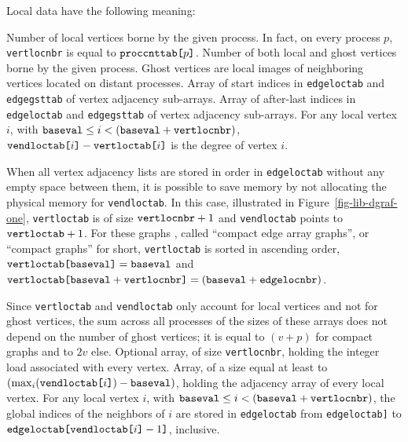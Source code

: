 Local data have the following meaning:
\begin{itemize}
\iteme[{\tt vertlocnbr}]
Number of local vertices borne by the given process. In
fact, on every process $p$, {\tt vert\lbt loc\lbt nbr} is equal to
${\tt proc\lbt cnt\lbt tab}\mbox{\tt [}p\mbox{\tt]}$.
\iteme[{\tt vertgstnbr}]
Number of both local and ghost vertices borne by the given process.
Ghost vertices are local images of neighboring vertices located on
distant processes.
\iteme[{\tt vertloctab}]
Array of start indices in {\tt edgeloctab} and {\tt edgegsttab} of
vertex adjacency sub-arrays.
\iteme[{\tt vendloctab}]
Array of after-last indices in {\tt edgeloctab} and {\tt edgegsttab}
of vertex adjacency sub-arrays.
For any local vertex $i$, with $\mbox{\tt baseval} \leq i < (\mbox{\tt
baseval} + \mbox{\tt vertlocnbr})$,
$\mbox{\tt vend\lbt loc\lbt tab[}i\mbox{\tt ]} -
\mbox{\tt vert\lbt loc\lbt tab[}i\mbox{\tt ]}$
is the degree of vertex $i$.

When all vertex adjacency lists are stored in order in
{\tt edge\lbt loc\lbt tab} without any empty space between them,
it is possible to save memory by not allocating the physical memory
for {\tt vend\lbt loc\lbt tab}. In this case, illustrated in
Figure~\ref{fig-lib-dgraf-one}, {\tt vert\lbt loc\lbt tab} is of size
$\mbox{\tt vert\lbt loc\lbt nbr} + 1$ and {\tt vend\lbt loc\lbt tab}
points to $\mbox{\tt vert\lbt loc\lbt tab} + 1$.
For these graphs , called ``compact edge array graphs'', or ``compact
graphs'' for short, {\tt vert\lbt loc\lbt tab} is sorted in
ascending order, $\mbox{\tt vert\lbt loc\lbt tab[}\lbt\mbox{\tt
baseval]} = \mbox{\tt baseval}$ and $\mbox{\tt vert\lbt loc\lbt
tab[}\lbt\mbox{\tt baseval} + \mbox{\tt vert\lbt loc\lbt nbr]} =
(\mbox{\tt baseval} + \mbox{\tt edge\lbt loc\lbt nbr})$.

Since {\tt vertloctab} and {\tt vendloctab} only account for local
vertices and not for ghost vertices, the sum across all processes of the
sizes of these arrays does not depend on the number of ghost vertices;
it is equal to $(v+p)$ for compact graphs and to $2v$ else.
\iteme[{\tt veloloctab}]
Optional array, of size {\tt vert\lbt loc\lbt nbr}, holding the
integer load associated with every vertex.
\iteme[{\tt edgeloctab}]
Array, of a size equal at least to $\left(\max_{i}(\mbox{\tt vend\lbt
loc\lbt tab[} i \mbox{\tt ]}) - \mbox{\tt baseval}\right)$, holding
the adjacency array of every local vertex.
For any local vertex $i$, with $\mbox{\tt baseval} \leq i < (\mbox{\tt
baseval} + \mbox{\tt vertlocnbr})$, the global indices of the neighbors
of $i$ are stored in {\tt edge\lbt loc\lbt tab}
from {\tt edge\lbt loc\lbt tab\lbt [vert\lbt loc\lbt tab[$i$]]} to
$\mbox{\tt edge\lbt loc\lbt tab[vend\lbt loc\lbt tab[}i\mbox{\tt ]} -
1\mbox{\tt ]}$, inclusive.


\end{itemize}
